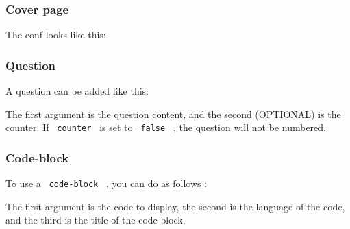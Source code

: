 \subsubsection{Cover page}\label{cover-page}

The conf looks like this:

\begin{Shaded}
\begin{Highlighting}[]
\NormalTok{)}
\end{Highlighting}
\end{Shaded}

\subsubsection{Question}\label{question}

A question can be added like this:

\begin{Shaded}
\begin{Highlighting}[]
\end{Highlighting}
\end{Shaded}

The first argument is the question content, and the second (OPTIONAL) is
the counter. If \texttt{\ counter\ } is set to \texttt{\ false\ } , the
question will not be numbered.

\subsubsection{Code-block}\label{code-block}

To use a \texttt{\ code-block\ } , you can do as follows :

\begin{Shaded}
\begin{Highlighting}[]
\end{Highlighting}
\end{Shaded}

The first argument is the code to display, the second is the language of
the code, and the third is the title of the code block.


